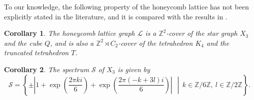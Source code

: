 \documentclass[lualatex,12pt]{article}
\newtheorem{cor}{Corollary}
\begin{document}
To our knowledge, 
the following property of the honeycomb lattice 
has not been explicitly stated in the literature, 
and it is compared with the results in \cite{kotani2001standard,sunada2012topological}.
\begin{cor}
 The honeycomb lattice graph ${\mathcal L}$ is a ${\mathbb Z}^2$-cover of
 the star graph $X_3$ and the cube $Q$, and is also
 a ${\mathbb Z}^2\rtimes C_2$-cover of the tetrahedron $K_4$ and the truncated tetrahedron $T$.
\end{cor}


\begin{cor}
 The spectrum ${\mathcal S}$ of $X_3$ is given by
\[
 {\mathcal S}=\left\{\pm\left|1+\exp\left({\frac{2\pi{k}{i}}{6}}\right) +
 \exp\left({\frac{2\pi{(-k+3l)}{i}}{6}}\right) \right|~~\middle|\,
 k\in {\mathbb Z}/6{\mathbb Z},~ l\in {\mathbb Z}/2{\mathbb Z}\right\}.
\]
\end{cor}
\end{document}
